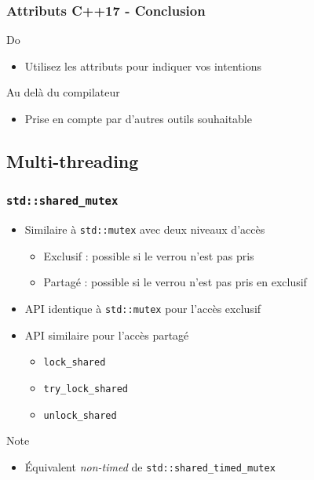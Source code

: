 \documentclass[C++.tex]{subfiles}
\begin{document}
\begin{frame}[fragile]
	\frametitle{Attributs C++17 - Conclusion}
	\begin{exampleblock}{Do}
		\begin{itemize}
			\item Utilisez les attributs pour indiquer vos intentions
		\end{itemize}

	\end{exampleblock}

	\begin{block}{Au delà du compilateur}
		\begin{itemize}
			\item Prise en compte par d'autres outils souhaitable

		\end{itemize}
	\end{block}
\end{frame}

\subsection*{Multi-threading}
\begin{frame}[fragile]
	\frametitle{\lstinline|std::shared_mutex|}
	\begin{itemize}
		\item Similaire à \lstinline|std::mutex| avec deux niveaux d'accès
		\begin{itemize}
			\item Exclusif : possible si le verrou n'est pas pris
			\item Partagé : possible si le verrou n'est pas pris en exclusif
		\end{itemize}
		\item API identique à \lstinline|std::mutex| pour l'accès exclusif
		\item API similaire pour l'accès partagé
		\begin{itemize}
			\item \lstinline|lock_shared|
			\item \lstinline|try_lock_shared|
			\item \lstinline|unlock_shared|
		\end{itemize}
	\end{itemize}

	\begin{block}{Note}
		\begin{itemize}
			\item Équivalent \textit{non-timed} de \lstinline|std::shared_timed_mutex|
		\end{itemize}
	\end{block}
\end{frame}
\end{document}
